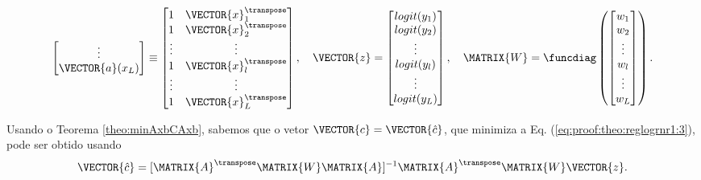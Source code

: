 \begin{myproofT}
\begin{equation}
\begin{bmatrix}
\vdots\\
\VECTOR{a}(x_L)\\
\end{bmatrix}
\equiv
\begin{bmatrix}
1 & \VECTOR{x}_1^{\transpose}\\
1 & \VECTOR{x}_2^{\transpose}\\
\vdots & \vdots\\
1 & \VECTOR{x}_l^{\transpose}\\
\vdots & \vdots\\
1 & \VECTOR{x}_L^{\transpose}\\ 
\end{bmatrix},
\quad
\VECTOR{z}=
\begin{bmatrix}
logit(y_1)  \\
logit(y_2)  \\
\vdots  \\
logit(y_l)  \\
\vdots \\
logit(y_L) \\
\end{bmatrix},
\quad
\MATRIX{W}=\funcdiag \left(
\begin{bmatrix}
w_1 \\
w_2 \\
\vdots  \\
w_l \\
\vdots \\
w_L \\
\end{bmatrix} \right).
\end{equation}


Usando o Teorema \ref{theo:minAxbCAxb}, sabemos que o vetor $\VECTOR{c}=\VECTOR{\hat{c}}$,
que minimiza a Eq. (\ref{eq:proof:theo:reglogrnr1:3}), pode ser obtido usando 
\begin{equation}\label{eq:proof:theo:reglogrnr1:5}
\VECTOR{\hat{c}}=[\MATRIX{A}^{\transpose}\MATRIX{W}\MATRIX{A}]^{-1}\MATRIX{A}^{\transpose}\MATRIX{W}\VECTOR{z}.
\end{equation}
\end{myproofT}

